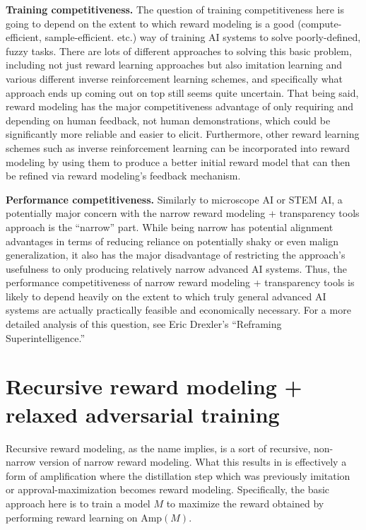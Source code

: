 \documentclass[
  onecolumn,
  natbib,
]{miri-tech-article}
\begin{document}
\textbf{Training competitiveness.} The question of training competitiveness here is going to depend on the extent to which reward modeling is a good (compute-efficient, sample-efficient. etc.) way of training AI systems to solve poorly-defined, fuzzy tasks. There are lots of different approaches to solving this basic problem, including not just reward learning approaches but also imitation learning and various\cite{TODO: cite https://arxiv.org/abs/1606.03476} different\cite{TODO: cite https://arxiv.org/abs/1710.11248} inverse reinforcement learning schemes, and specifically what approach ends up coming out on top still seems quite uncertain. That being said, reward modeling has the major competitiveness advantage of only requiring and depending on human feedback, not human demonstrations, which could be significantly more reliable and easier to elicit. Furthermore, other reward learning schemes such as inverse reinforcement learning can be incorporated into reward modeling by using them to produce a better initial reward model that can then be refined via reward modeling's feedback mechanism.

\textbf{Performance competitiveness.} Similarly to microscope AI or STEM AI, a potentially major concern with the narrow reward modeling + transparency tools approach is the ``narrow'' part. While being narrow has potential alignment advantages in terms of reducing reliance on potentially shaky or even malign generalization, it also has the major disadvantage of restricting the approach's usefulness to only producing relatively narrow advanced AI systems. Thus, the performance competitiveness of narrow reward modeling + transparency tools is likely to depend heavily on the extent to which truly general advanced AI systems are actually practically feasible and economically necessary. For a more detailed analysis of this question, see Eric Drexler's ``Reframing Superintelligence\cite{TODO: cite https://www.fhi.ox.ac.uk/wp-content/uploads/Reframing_Superintelligence_FHI-TR-2019-1.1-1.pdf}.''

\section{Recursive reward modeling + relaxed adversarial training}
\label{sec:8}

Recursive reward modeling\cite{TODO: cite https://medium.com/@deepmindsafetyresearch/scalable-agent-alignment-via-reward-modeling-bf4ab06dfd84}, as the name implies, is a sort of recursive, non-narrow version of narrow reward modeling. What this results in is effectively a form of amplification where the distillation step which was previously imitation or approval-maximization becomes reward modeling. Specifically, the basic approach here is to train a model $M$ to maximize the reward obtained by performing reward learning on $\text{Amp}(M)$.
\end{document}
